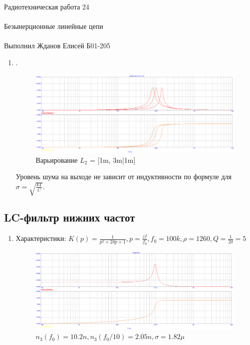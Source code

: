 \documentclass{astroedu-lab}
\begin{document}
\begin{problem}{\huge Радиотехническая работа 24\\\\Безынерционные линейные цепи\\\\Выполнил Жданов Елисей Б01-205}
\begin{enumerate}
\item

.

\begin{figure}[h!]
    \centering
    \includegraphics[scale=0.3]{images/mod3_2_5.png}
    \caption{Варьирование $L_2$ = [1m, 3m|1m]}
    \label{fig:m325}
\end{figure}

Уровень шума на выходе не зависит от индуктивности по формуле для $\sigma = \sqrt{\frac{kT}{C}}$.

\end{enumerate}

\subsection*{LC-фильтр нижних частот}

\begin{enumerate}	

\item

Характеристики: $K(p) = \frac{1}{p^2+2 \delta p + 1}, p = \frac{j f}{f_0}, f_0 = 100 k, \rho = 1260, Q = \frac{1}{2 \delta} = 5$

\newpage	

\begin{figure}[h!]
    \centering
    \includegraphics[scale=0.3]{images/mod3_3_1.png}
    \caption{$n_3(f_0) = 10.2n, n_3(f_0/10) = 2.05n, \sigma = 1.82\mu$}
    \label{fig:m331}
\end{figure}


\end{enumerate}
\end{problem}
\end{document}
